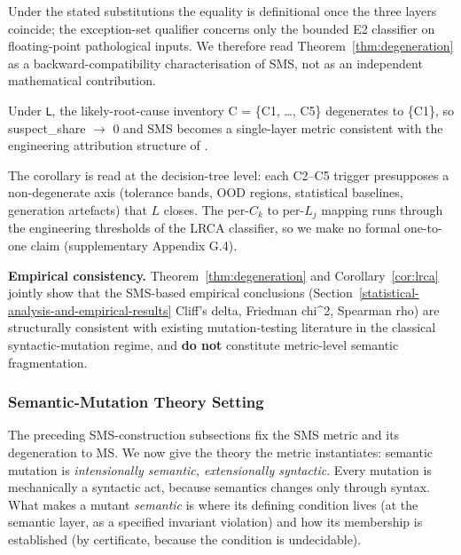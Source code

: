 \documentclass[manuscript,screen,review]{acmart}
\begin{document}
Under the stated substitutions the equality is definitional once the
three layers coincide; the exception-set qualifier concerns only
the bounded E2 classifier on floating-point pathological inputs. We
therefore read Theorem~\ref{thm:degeneration} as a
backward-compatibility characterisation of SMS, not as an independent
mathematical contribution.

\begin{corollary}\label{cor:lrca}
Under \texttt{L}, the
likely-root-cause inventory C = \{C1, \ldots, C5\} degenerates to
\{C1\}, so suspect\_share $\to$ 0 and SMS becomes a single-layer metric
consistent with the engineering attribution structure of
\citet{d7c38286734419b52de4262c9802ebdfcf4b9447}.
\end{corollary}

The corollary is read at the decision-tree level: each C2--C5 trigger
presupposes a non-degenerate axis (tolerance bands, OOD regions,
statistical baselines, generation artefacts) that $L$ closes. The
per-$C_k$ to per-$L_j$ mapping runs through the engineering thresholds
of the LRCA classifier, so we make no formal one-to-one claim
(supplementary Appendix G.4).

\textbf{Empirical consistency.} Theorem~\ref{thm:degeneration} and
Corollary~\ref{cor:lrca} jointly
show that the SMS-based empirical conclusions (Section~\ref{statistical-analysis-and-empirical-results} Cliff's delta,
Friedman chi\^{}2, Spearman rho) are structurally consistent with
existing mutation-testing literature in the classical syntactic-mutation
regime, and \textbf{do not} constitute metric-level semantic
fragmentation.


\subsubsection{Semantic-Mutation Theory Setting}\label{theory-setting}

The preceding SMS-construction subsections fix the SMS metric and its degeneration to MS. We now
give the theory the metric instantiates: semantic mutation is
\emph{intensionally semantic, extensionally syntactic}. Every mutation
is mechanically a syntactic act, because semantics changes only through
syntax. What makes a mutant \emph{semantic} is where its defining
condition lives (at the semantic layer, as a specified invariant
violation) and how its membership is established (by certificate,
because the condition is undecidable).
\end{document}
